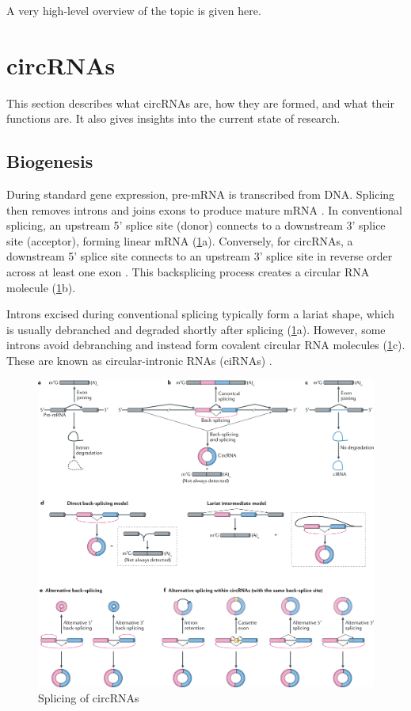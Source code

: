 A very high-level overview of the topic is given here.

\lipsum[1]

\section{circRNAs}
This section describes what circRNAs are, how they are formed, and what their functions are.
It also gives insights into the current state of research.

\subsection{Biogenesis}
During standard gene expression, pre-mRNA is transcribed from DNA.
Splicing then removes introns and joins exons to produce mature mRNA \supercite{black_mechanisms_2003}.
In conventional splicing, an upstream 5' splice site (donor) connects to a downstream 3' splice site (acceptor), forming linear mRNA (\cref{fig:circRNA_splicing}a).
Conversely, for circRNAs, a downstream 5' splice site connects to an upstream 3' splice site in reverse order across at least one exon \supercite{chen_expanding_2020}.
This backsplicing process creates a circular RNA molecule (\cref{fig:circRNA_splicing}b).

Introns excised during conventional splicing typically form a lariat shape, which is usually debranched and degraded shortly after splicing (\cref{fig:circRNA_splicing}a).
However, some introns avoid debranching and instead form covalent circular RNA molecules (\cref{fig:circRNA_splicing}c).
These are known as circular-intronic RNAs (ciRNAs) \supercite{chen_expanding_2020,zhang_circular_2013}.

\begin{figure}[h]
    \centering
    \includegraphics[width=\textwidth]{chapters/background/figures/circRNA-splicing.png}
    \caption{Splicing of circRNAs}
    \label{fig:circRNA_splicing}
\end{figure}


